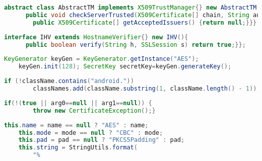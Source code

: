         \begin{lstlisting}[frame=tb,caption={Anonymous inner class object with a vulnerable \checkServerTrusted method (F13)}, label={lst:aic_x509tm},language=java]
    abstract class AbstractTM implements X509TrustManager{} new AbstractTM(){
      public void checkServerTrusted(X509Certificate[] chain, String authType) throws CertificateException {}
        public X509Certificate[] getAcceptedIssuers() {return null;}}};
        \end{lstlisting}
        \vspace{-0.25em}
    
    \begin{lstlisting}[frame=tb,caption={\small Anonymous Inner Class Object of an Interface that extends \hostnameVerifier}, label={lst:aic_empty_ext_interface_hostname},language=java]
    interface IHV extends HostnameVerifier{} new IHV(){
      public boolean verify(String h, SSLSession s) return true;}};
        \end{lstlisting}
        \vspace{-0.25em}
        
    
        \begin{lstlisting}[frame=tb,caption={\small Misuse case requiring a trivial new operator}, label={lst:trivial},language=java]
    KeyGenerator keyGen = KeyGenerator.getInstance("AES");
    keyGen.init(128); SecretKey secretKey=keyGen.generateKey();
        \end{lstlisting}
        \vspace{-0.25em}
    
        \begin{lstlisting}[frame=tb,caption={\small \cryptoguard's code ignoring names with "android"}, label={lst:android-dot},language=java]
    if (!className.contains("android."))
        classNames.add(className.substring(1, className.length() - 1)); return classNames;
     \end{lstlisting}
        \vspace{-0.25em}
        
        \begin{lstlisting}[frame=tb,caption={\small Generic Conditions in \checkServerTrusted{}}, label={lst:xtrustManagerGenericConditions},language=java]
    if(!(true || arg0==null || arg1==null)) {
        throw new CertificateException();}
    \end{lstlisting}
    \vspace{-0.25em}
    
    
    \begin{lstlisting}[frame=tb,caption={\small Transformation String formation in Apache Druid similar to \fnumber{2} which uses \AES in \texttt{CBC} mode with \texttt{PKCS5Padding}, a configuration that is known to be a misuse~\cite{FBX+17}.}, label={lst:transformationstring:apache:druid},language=java]
    this.name = name == null ? "AES" : name;
    this.mode = mode == null ? "CBC" : mode;
    this.pad = pad == null ? "PKCS5Padding" : pad;
    this.string = StringUtils.format(
        "%
    \end{lstlisting}
    \vspace{-0.25em}

